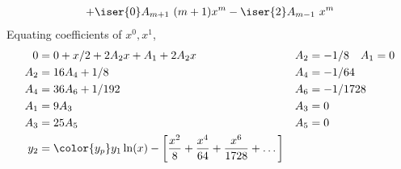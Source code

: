 \begin{enumerate}
\begin{align}
              + \iser{0}A_{m+1}\ (m+1)x^m - \iser{2}A_{m-1}\ x^m
          \end{align}
          Equating coefficients of $ x^0, x^1 $,
          \begin{align}
              0   & = 0 + x/2 + 2A_2 x + A_1 + 2A_2 x              &
              A_2 & = -1/8 \quad A_1 = 0                                           \\
              A_2 & = 16A_4 + 1/8                                  & A_4 & = -1/64 \\
              A_4 & = 36A_6 + 1/192                                &
              A_6 & = -1/1728                                                      \\
              A_1 & = 9A_3                                         & A_3 & = 0     \\
              A_3 & = 25A_5                                        &
              A_5 & = 0                                                            \\
              y_2 & = \color{y_p} y_1\ln(x) - \left[ \frac{x^2}{8}
                  + \frac{x^4}{64} + \frac{x^6}{1728} + \dots \right]
          \end{align}


\end{enumerate}

